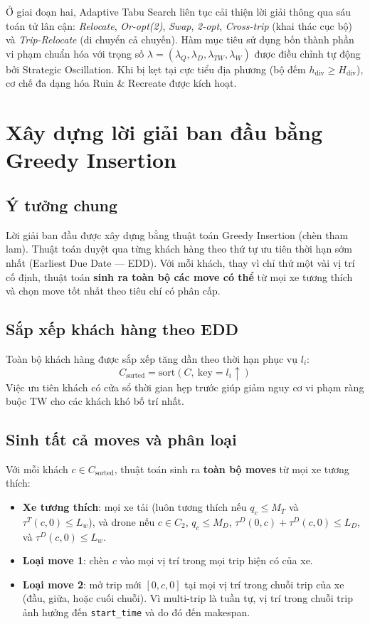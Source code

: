 \documentclass[../DoAn.tex]{subfiles}
\begin{document}
Ở giai đoạn hai, Adaptive Tabu Search liên tục cải thiện lời giải thông qua sáu toán tử lân cận: \textit{Relocate}, \textit{Or-opt(2)}, \textit{Swap}, \textit{2-opt}, \textit{Cross-trip} (khai thác cục bộ) và \textit{Trip-Relocate} (di chuyển cả chuyến). Hàm mục tiêu sử dụng bốn thành phần vi phạm chuẩn hóa với trọng số $\lambda = (\lambda_Q, \lambda_D, \lambda_{TW}, \lambda_W)$ được điều chỉnh tự động bởi Strategic Oscillation. Khi bị kẹt tại cực tiểu địa phương (bộ đếm $h_{\text{div}} \geq H_{\text{div}}$), cơ chế đa dạng hóa Ruin \& Recreate được kích hoạt.

\section{Xây dựng lời giải ban đầu bằng Greedy Insertion}

\subsection{Ý tưởng chung}

Lời giải ban đầu được xây dựng bằng thuật toán Greedy Insertion (chèn tham lam). Thuật toán duyệt qua từng khách hàng theo thứ tự ưu tiên thời hạn sớm nhất (Earliest Due Date --- EDD). Với mỗi khách, thay vì chỉ thử một vài vị trí cố định, thuật toán \textbf{sinh ra toàn bộ các move có thể} từ mọi xe tương thích và chọn move tốt nhất theo tiêu chí có phân cấp.

\subsection{Sắp xếp khách hàng theo EDD}

Toàn bộ khách hàng được sắp xếp tăng dần theo thời hạn phục vụ $l_i$:
\[
C_{\text{sorted}} = \text{sort}\!\left(C,\ \text{key} = l_i \uparrow\right)
\]
Việc ưu tiên khách có cửa sổ thời gian hẹp trước giúp giảm nguy cơ vi phạm ràng buộc TW cho các khách khó bố trí nhất.

\subsection{Sinh tất cả moves và phân loại}

Với mỗi khách $c \in C_{\text{sorted}}$, thuật toán sinh ra \textbf{toàn bộ moves} từ mọi xe tương thích:

\begin{itemize}
    \item \textbf{Xe tương thích}: mọi xe tải (luôn tương thích nếu $q_c \leq M_T$ và $\tau^T(c, 0) \leq L_w$), và drone nếu $c \in C_2$, $q_c \leq M_D$, $\tau^D(0,c)+\tau^D(c,0) \leq L_D$, và $\tau^D(c,0) \leq L_w$.
    \item \textbf{Loại move 1}: chèn $c$ vào mọi vị trí trong mọi trip hiện có của xe.
    \item \textbf{Loại move 2}: mở trip mới $[0,c,0]$ tại mọi vị trí trong chuỗi trip của xe (đầu, giữa, hoặc cuối chuỗi). Vì multi-trip là tuần tự, vị trí trong chuỗi trip ảnh hưởng đến \texttt{start\_time} và do đó đến makespan.
\end{itemize}
\end{document}
